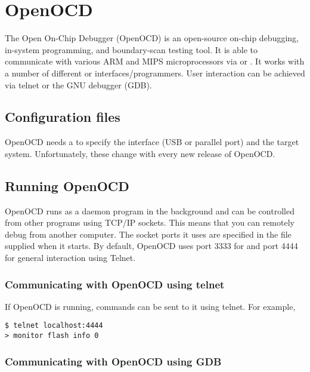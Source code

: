 \chapter{OpenOCD}

The Open On-Chip Debugger (OpenOCD) is an open-source on-chip
debugging, in-system programming, and boundary-scan testing tool. It
is able to communicate with various ARM and MIPS microprocessors via
 or . It works with a number of different
 or  interfaces/programmers. User
interaction can be achieved via telnet or the GNU debugger (GDB).

\section{Configuration files}
\label{configuration-files}

OpenOCD needs a  to
specify the interface (USB or parallel port) and the target system.
Unfortunately, these change with every new release of OpenOCD.

\section{Running OpenOCD}
\label{running-openocd}

OpenOCD runs as a daemon program in the background and can be controlled
from other programs using TCP/IP sockets. This means that you can
remotely debug from another computer. The socket ports it uses are
specified in the 
file supplied when it starts. By default, OpenOCD uses port 3333 for
 and port 4444 for general interaction using Telnet.

\subsection{Communicating with OpenOCD using telnet}
\label{communicating-with-openocd-using-telnet}

If OpenOCD is running, commands can be sent to it using telnet. For
example,

\begin{verbatim}
$ telnet localhost:4444
> monitor flash info 0
\end{verbatim}

\subsection{Communicating with OpenOCD using GDB}
\label{communicating-with-openocd-using-gdb}

